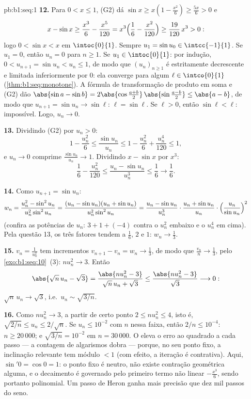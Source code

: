 \begin{solution}{pb:b1:seq:1}
\textbf{12.} Para $0 < x \leq 1$, (G2) dá $\sin x \geq x(1 -
\frac{x^2}{6}) \geq \frac{5x}{6} > 0$ e
\[
x - \sin x \geq \frac{x^3}{6} - \frac{x^5}{120}
= x^3\Bigl(\frac16 - \frac{x^2}{120}\Bigr)
\geq \frac{19}{120}\,x^3 > 0 :
\]
logo $0 < \sin x < x$ em $\intoc{0}{1}$. Sempre $u_1 = \sin u_0
\in \intcc{-1}{1}$. Se $u_1 = 0$, então $u_n = 0$ para $n \geq 1$.
Se $u_1 \in \intoc{0}{1}$: por indução, $0 < u_{n+1} = \sin u_n
< u_n \leq 1$, de modo que $(u_n)_{n\geq1}$ é estritamente decrescente e
limitada inferiormente por $0$: ela converge para algum $\ell \in
\intco{0}{1}$ (\cref{thm:b1:seq:monotone}). A fórmula de transformação de
produto em soma e (G2) dão $\abs{\sin a - \sin b} = 2\abs{\cos
\frac{a+b}{2}}\,\abs{\sin\frac{a-b}{2}} \leq \abs{a - b}$, de modo que
$u_{n+1} = \sin u_n \to \sin \ell$: $\ell = \sin\ell$. Se $\ell
> 0$, então $\sin\ell < \ell$: impossível. Logo, $u_n \to 0$.

\textbf{13.} Dividindo (G2) por $u_n > 0$:
\[
1 - \frac{u_n^2}{6} \leq \frac{\sin u_n}{u_n} \leq 1 -
\frac{u_n^2}{6} + \frac{u_n^4}{120} \leq 1 ,
\]
e $u_n \to 0$ comprime $\frac{\sin u_n}{u_n} \to 1$. Dividindo
$x - \sin x$ por $x^3$:
\[
\frac16 - \frac{u_n^2}{120} \leq \frac{u_n - \sin u_n}{u_n^3}
\leq \frac16 \longrightarrow \frac16 .
\]

\textbf{14.} Como $u_{n+1} = \sin u_n$:
\[
w_n = \frac{u_n^2 - \sin^2 u_n}{u_n^2 \sin^2 u_n}
= \frac{(u_n - \sin u_n)(u_n + \sin u_n)}{u_n^2 \sin^2 u_n}
= \frac{u_n - \sin u_n}{u_n^3}\cdot
\frac{u_n + \sin u_n}{u_n}\cdot
\Bigl(\frac{u_n}{\sin u_n}\Bigr)^{2}
\]
(confira as potências de $u_n$: $3 + 1 + (-4)$ contra o $u_n^2$
embaixo e o $u_n^4$ em cima). Pela questão 13, os três
fatores tendem a $\frac16$, $2$ e $1$: $w_n \to \frac13$.

\textbf{15.} $v_n = \frac{1}{u_n^2}$ tem incrementos $v_{n+1} -
v_n = w_n \to \frac13$, de modo que $\frac{v_n}{n} \to \frac13$, pelo
\cref{exo:b1:seq:10}~(3): $n u_n^2 \to 3$. Então
\[
\abs{\sqrt n\,u_n - \sqrt 3}
= \frac{\abs{n u_n^2 - 3}}{\sqrt n\,u_n + \sqrt 3}
\leq \frac{\abs{n u_n^2 - 3}}{\sqrt 3} \longrightarrow 0 :
\]
$\sqrt n\,u_n \to \sqrt 3$, i.e.\ $u_n \sim \sqrt{3/n}$.

\textbf{16.} Como $n u_n^2 \to 3$, a partir de certo ponto $2 \leq n u_n^2
\leq 4$, isto é, $\sqrt{2/n} \leq u_n \leq 2/\sqrt n$. Se $u_n
\leq 10^{-2}$ com $n$ nessa faixa, então $2/n \leq 10^{-4}$:
$n \geq 20\,000$; e $\sqrt{3/n} = 10^{-2}$ em $n = 30\,000$.
O  eleva o erro ao quadrado a cada passo --- a
contagem de algarismos dobra --- porque, no seu ponto fixo, a
inclinação relevante tem módulo $< 1$ (com efeito, a iteração é
contrativa). Aqui, $\sin' 0 = \cos 0 = 1$: o ponto fixo é neutro, não
existe contração geométrica alguma, e o decaimento é governado pelo
primeiro termo não linear $-\frac{x^3}{6}$, sendo portanto polinomial. Um
passo de Heron ganha mais precisão que dez mil passos do seno.


\end{solution}
